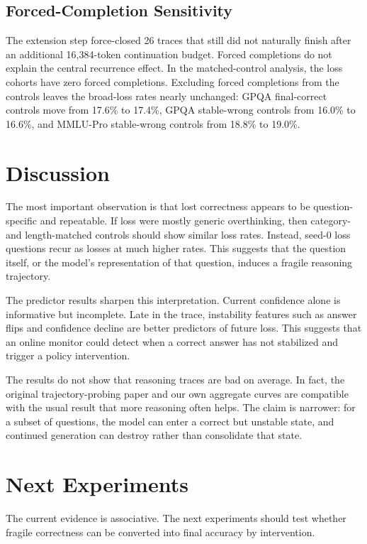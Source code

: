 \documentclass[11pt]{article}
\begin{document}
\subsection{Forced-Completion Sensitivity}

The extension step force-closed 26 traces that still did not naturally finish
after an additional 16,384-token continuation budget. Forced completions do
not explain the central recurrence effect. In the matched-control analysis,
the loss cohorts have zero forced completions. Excluding forced completions
from the controls leaves the broad-loss rates nearly unchanged: GPQA
final-correct controls move from 17.6\% to 17.4\%, GPQA stable-wrong controls
from 16.0\% to 16.6\%, and MMLU-Pro stable-wrong controls from 18.8\% to
19.0\%.

\section{Discussion}

The most important observation is that lost correctness appears to be
question-specific and repeatable. If loss were mostly generic overthinking,
then category- and length-matched controls should show similar loss rates.
Instead, seed-0 loss questions recur as losses at much higher rates. This
suggests that the question itself, or the model's representation of that
question, induces a fragile reasoning trajectory.

The predictor results sharpen this interpretation. Current confidence alone
is informative but incomplete. Late in the trace, instability features such
as answer flips and confidence decline are better predictors of future loss.
This suggests that an online monitor could detect when a correct answer has
not stabilized and trigger a policy intervention.

The results do not show that reasoning traces are bad on average. In fact,
the original trajectory-probing paper and our own aggregate curves are
compatible with the usual result that more reasoning often helps. The claim
is narrower: for a subset of questions, the model can enter a correct but
unstable state, and continued generation can destroy rather than consolidate
that state.

\section{Next Experiments}

The current evidence is associative. The next experiments should test whether
fragile correctness can be converted into final accuracy by intervention.
\end{document}
